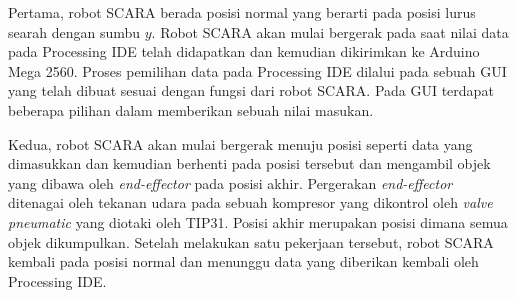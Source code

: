 Pertama, robot SCARA berada posisi normal yang berarti pada posisi lurus searah dengan sumbu $y$. Robot SCARA akan mulai bergerak pada saat nilai data pada Processing IDE telah didapatkan dan kemudian dikirimkan ke Arduino Mega 2560. Proses pemilihan data pada Processing IDE dilalui pada sebuah GUI yang telah dibuat sesuai dengan fungsi dari robot SCARA. Pada GUI terdapat beberapa pilihan dalam memberikan sebuah nilai masukan. 

Kedua, robot SCARA akan mulai bergerak menuju posisi seperti data yang dimasukkan dan kemudian berhenti pada posisi tersebut dan mengambil objek yang dibawa oleh \textit{end-effector} pada posisi akhir.  Pergerakan \textit{end-effector} ditenagai oleh tekanan udara pada sebuah kompresor yang dikontrol oleh\textit{ valve pneumatic} yang diotaki oleh TIP31. Posisi akhir merupakan posisi dimana semua objek dikumpulkan. Setelah melakukan satu pekerjaan tersebut, robot SCARA kembali pada posisi normal dan menunggu data yang diberikan kembali oleh Processing IDE.  


